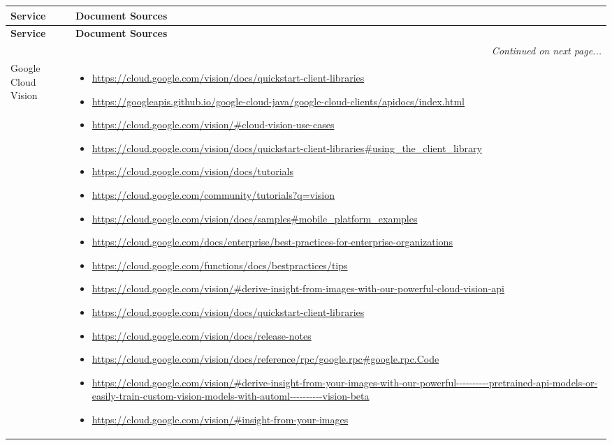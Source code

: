 {\scriptsize
\begin{longtable}{p{.2\linewidth}|p{.725\linewidth}}
  \toprule
  \textbf{Service} & \textbf{Document Sources}\\
  \midrule
  \endfirsthead
  \toprule
  \textbf{Service} & \textbf{Document Sources}\\
  \midrule
  \endhead
  \bottomrule
  \multicolumn{2}{r}{\textit{Continued on next page...}}\\
  \endfoot
  \bottomrule
  \endlastfoot
    Google Cloud Vision &
    \vspace{-1.75mm}
    \begin{itemize}[label=,leftmargin=10pt,topsep=0pt,partopsep=0pt,noitemsep,nolistsep,itemindent=-10pt]
\item \url{https://cloud.google.com/vision/docs/quickstart-client-libraries}
\item \url{https://googleapis.github.io/google-cloud-java/google-cloud-clients/apidocs/index.html}
\item \url{https://cloud.google.com/vision/#cloud-vision-use-cases}
\item \url{https://cloud.google.com/vision/docs/quickstart-client-libraries#using_the_client_library}
\item \url{https://cloud.google.com/vision/docs/tutorials}
\item \url{https://cloud.google.com/community/tutorials?q=vision}
\item \url{https://cloud.google.com/vision/docs/samples#mobile_platform_examples}
\item \url{https://cloud.google.com/docs/enterprise/best-practices-for-enterprise-organizations}
\item \url{https://cloud.google.com/functions/docs/bestpractices/tips}
\item \url{https://cloud.google.com/vision/#derive-insight-from-images-with-our-powerful-cloud-vision-api}
\item \url{https://cloud.google.com/vision/docs/quickstart-client-libraries}
\item \url{https://cloud.google.com/vision/docs/release-notes}
\item \url{https://cloud.google.com/vision/docs/reference/rpc/google.rpc#google.rpc.Code}
\item \url{https://cloud.google.com/vision/#derive-insight-from-your-images-with-our-powerful----------pretrained-api-models-or-easily-train-custom-vision-models-with-automl----------vision-beta}
\item \url{https://cloud.google.com/vision/#insight-from-your-images}

\end{itemize}
\end{longtable}}
